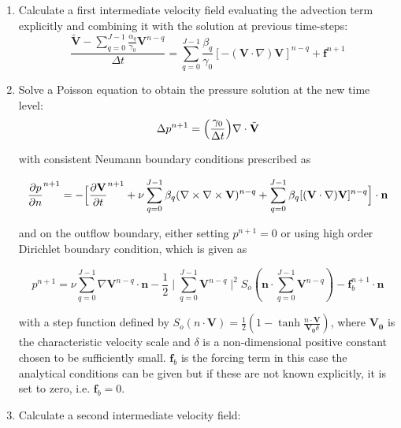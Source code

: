 \begin{enumerate}
\item Calculate a first intermediate velocity field evaluating the advection term explicitly and combining it with the solution at previous time-steps:
\begin{equation}
 \frac{\tilde{\mathbf{V}}-\sum_{q=0}^{J-1}\frac{\alpha_q}{\gamma_0}\mathbf{V}^{n-q}}{\Delta t}=\sum_{q=0}^{J-1}\frac{\beta_q}{\gamma_0}[-(\mathbf{V}\cdot\nabla)\mathbf{V}]^{n-q} +  \mathbf{f}^{n+1}\end{equation}

 \item Solve a Poisson equation to obtain the pressure solution at the new time level:
 \begin{equation}
  \Delta p^{n+1}=\Bigl(\frac{\gamma_0}{\Delta t}\Bigr)\nabla\cdot\tilde{\mathbf{V}}
 \end{equation}

with consistent Neumann boundary conditions prescribed as

\begin{equation}
 \frac{\partial p}{\partial n}^{n+1}= - \Bigl[ \frac{\partial \mathbf{V}}{\partial t}^{n+1} + \nu \sum_{q=0}^{J-1}\beta_q(\nabla \times \nabla \times   \mathbf{V})^{n-q} + \sum_{q=0}^{J-1}\beta_q [(\mathbf{V} \cdot \nabla)\mathbf{V}]^{n-q}\Bigr]\cdot \mathbf{n}
\end{equation}

and on the outflow boundary, either setting $ p^{n+1}=0$ or using high order Dirichlet boundary condition, which is given as\cite{DoKa14}

\begin{equation}
 p^{n+1}= \nu \sum_{q=0}^{J-1}\nabla\mathbf{V}^{n-q}\cdot \mathbf{n}-\frac{1}{2}
\mid \sum_{q=0}^{J-1}\mathbf{V}^{n-q} \mid^2 S_o(\mathbf{n}\cdot \sum_{q=0}^{J-1}\mathbf{V}^{n-q})-\mathbf{f}_b^{n+1}\cdot \mathbf{n}
\end{equation}

with a step function defined by $S_o(n\cdot
\mathbf{V})=\frac{1}{2}(1-\tanh\frac{n\cdot\mathbf{V}}{\mathbf{V_0}\delta})$,
where $\mathbf{V_0}$ is the characteristic velocity scale and $\delta$
is a non-dimensional positive constant chosen to be sufficiently
small. $\mathbf{f}_b$ is the forcing term in this case the analytical
conditions can be given but if these are not known explicitly, it is
set to zero, i.e. $\mathbf{f}_b=0$.

\item  Calculate a second intermediate velocity field:


\end{enumerate}
